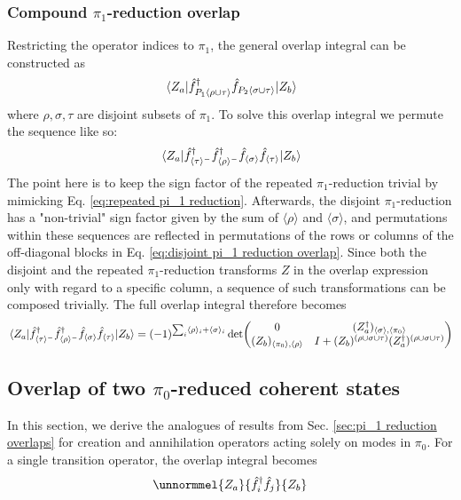 \documentclass[12pt]{article}
\newcommand{\seq}[1]{\langle #1\rangle}
\newcommand{\hc}{^\dagger}
\begin{document}
	\subsubsection{Compound $\pi_1$-reduction overlap} \label{sec: compound pi_1 reduction overlap}
	Restricting the operator indices to $\pi_1$, the general overlap integral can be constructed as
	\begin{equation}
	\mel{Z_a}{\hat{f}\hc_{P_1\seq{\rho\cup\tau}}\hat{f}_{P_2\seq{\sigma\cup\tau}}}{Z_b}
	\end{equation}
	where $\rho,\sigma,\tau$ are disjoint subsets of $\pi_1$. To solve this overlap integral we permute the sequence like so:
	\begin{equation}
	\mel{Z_a}{\hat{f}\hc_{\seq{\tau}^-}\hat{f}\hc_{\seq{\rho}^-}\hat{f}_{\seq{\sigma}}\hat{f}_{\seq{\tau}}}{Z_b}
	\end{equation}
	The point here is to keep the sign factor of the repeated $\pi_1$-reduction trivial by mimicking Eq. \ref{eq:repeated pi_1 reduction}. Afterwards, the disjoint $\pi_1$-reduction has a "non-trivial" sign factor given by the sum of $\seq{\rho}$ and $\seq{\sigma}$, and permutations within these sequences are reflected in permutations of the rows or columns of the off-diagonal blocks in Eq. \ref{eq:disjoint pi_1 reduction overlap}. Since both the disjoint and the repeated $\pi_1$-reduction transforms $Z$ in the overlap expression only with regard to a specific column, a sequence of such transformations can be composed trivially. The full overlap integral therefore becomes
	\begin{equation} \label{eq:compound pi_1 reduction overlap}
	\mel{Z_a}{\hat{f}\hc_{\seq{\tau}^-}\hat{f}\hc_{\seq{\rho}^-}\hat{f}_{\seq{\sigma}}\hat{f}_{\seq{\tau}}}{Z_b} = (-1)^{\sum_i\seq{\rho}_i + \seq{\sigma}_i}\det(\mqty{
		0 & (Z_a\hc)_{\seq{\sigma}, \seq{\pi_0}}\\
		(Z_b)_{\seq{\pi_0},\seq{\rho}} & I+(Z_b)^{(\rho\cup\sigma\cup\tau)} (Z_a\hc)^{(\rho\cup \sigma\cup\tau)}
	})
	\end{equation}
	
	\subsection{Overlap of two $\pi_0$-reduced coherent states}
	In this section, we derive the analogues of results from Sec. \ref{sec:pi_1 reduction overlaps} for creation and annihilation operators acting solely on modes in $\pi_0$. For a single transition operator, the overlap integral becomes
	\begin{equation} \label{eq: overlap of two pi_0 reduced coherent states problem}
	\unnormmel{Z_a}{\hat{f}\hc_i\hat{f}_j}{Z_b}
	\end{equation}
	
\end{document}
